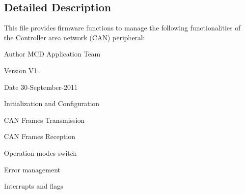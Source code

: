 \subsection{Detailed Description}
This file provides firmware functions to manage the following functionalities of the Controller area network (C\+AN) peripheral\+: 

\begin{DoxyAuthor}{Author}
M\+CD Application Team 
\end{DoxyAuthor}
\begin{DoxyVersion}{Version}
V1.. 
\end{DoxyVersion}
\begin{DoxyDate}{Date}
30-\/\+September-\/2011
\begin{DoxyItemize}
\item Initialization and Configuration
\item C\+AN Frames Transmission
\item C\+AN Frames Reception
\item Operation modes switch
\item Error management
\item Interrupts and flags
\end{DoxyItemize}
\end{DoxyDate}
